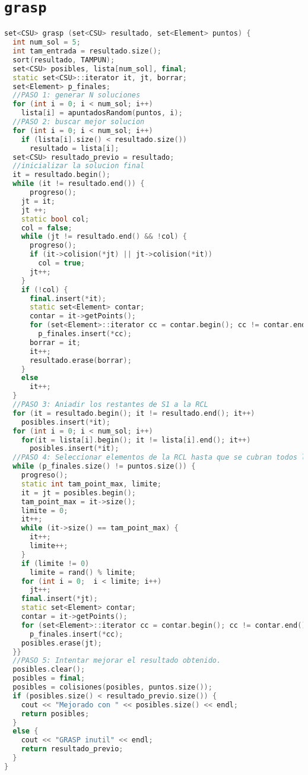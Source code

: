 \section{\texttt{grasp}} \label{app:grasp}

\begin{lstlisting}[language=C++, numbers=none,basicstyle=\ttfamily\footnotesize,
                   caption={Método heurístico GRASP},]
set<CSU> grasp (set<CSU> resultado, set<Element> puntos) {
  int num_sol = 5;
  int tam_entrada = resultado.size();
  sort(resultado, TAMPUN);
  set<CSU> posibles, lista[num_sol], final;
  static set<CSU>::iterator it, jt, borrar;
  set<Element> p_finales;
  //PASO 1: generar N soluciones
  for (int i = 0; i < num_sol; i++)
    lista[i] = apuntadosRandom(puntos, i);
  //PASO 2: buscar mejor solucion
  for (int i = 0; i < num_sol; i++)
    if (lista[i].size() < resultado.size())
      resultado = lista[i];
  set<CSU> resultado_previo = resultado;
  //inicializar la solucion final
  it = resultado.begin();
  while (it != resultado.end()) {
      progreso();
    jt = it;
    jt ++;
    static bool col;
    col = false;
    while (jt != resultado.end() && !col) {
      progreso();
      if (it->colision(*jt) || jt->colision(*it))
        col = true;
      jt++;
    }
    if (!col) {
      final.insert(*it);
      static set<Element> contar;
      contar = it->getPoints();
      for (set<Element>::iterator cc = contar.begin(); cc != contar.end(); cc++)
        p_finales.insert(*cc);
      borrar = it;
      it++;
      resultado.erase(borrar);
    }
    else
      it++;
  }
  //PASO 3: Aniadir los restantes de S1 a la RCL
  for (it = resultado.begin(); it != resultado.end(); it++)
    posibles.insert(*it);
  for (int i = 0; i < num_sol; i++)
    for(it = lista[i].begin(); it != lista[i].end(); it++)
      posibles.insert(*it);
  //PASO 4: Seleccionar elementos de la RCL hasta que se cubran todos los puntos
  while (p_finales.size() != puntos.size()) {
    progreso();
    static int tam_point_max, limite;
    it = jt = posibles.begin();
    tam_point_max = it->size();
    limite = 0;
    it++;
    while (it->size() == tam_point_max) {
      it++;
      limite++;
    }
    if (limite != 0)
      limite = rand() % limite;
    for (int i = 0;  i < limite; i++)
      jt++;
    final.insert(*jt);
    static set<Element> contar;
    contar = it->getPoints();
    for (set<Element>::iterator cc = contar.begin(); cc != contar.end(); cc++)
      p_finales.insert(*cc);
    posibles.erase(jt);
  }}
  //PASO 5: Intentar mejorar el resultado obtenido.
  posibles.clear();
  posibles = final;
  posibles = colisiones(posibles, puntos.size());
  if (posibles.size() < resultado_previo.size()) {
    cout << "Mejorado con " << posibles.size() << endl;
    return posibles;
  }
  else {
    cout << "GRASP inutil" << endl;
    return resultado_previo;
  }
}

\end{lstlisting}

